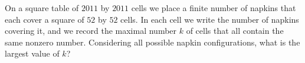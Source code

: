 On a square table of 
$2011$
 by 
$2011$
 cells we place a finite number of napkins that each cover a square of 
$52$
 by 
$52$
 cells. In each cell we write the number of napkins covering it, and we record the maximal number 
$k$
 of cells that all contain the same nonzero number. Considering all possible napkin configurations, what is the largest value of 
$k$?
